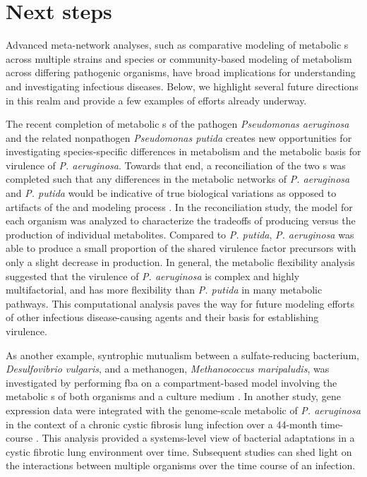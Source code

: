 \section{Next steps}

Advanced meta-network analyses, such as comparative modeling 
of metabolic s across multiple strains and 
species or community-based modeling of metabolism across 
differing pathogenic organisms, have broad implications 
for understanding and investigating infectious diseases. 
Below, we highlight several future directions in this 
realm and provide a few examples of efforts already underway.

The recent completion of metabolic s of the 
pathogen \textit{Pseudomonas aeruginosa} \cite{Oberhardt:2008fr} and the related nonpathogen 
\textit{Pseudomonas putida} \cite{Puchalka:2008ct} creates new opportunities for 
investigating species-specific differences in metabolism 
and the metabolic basis for virulence of \textit{P. aeruginosa}. 
Towards that end, a reconciliation of the two s 
was completed such that any differences in the metabolic 
networks of \textit{P. aeruginosa} and \textit{P. putida} would be indicative 
of true biological variations as opposed to artifacts of 
the  and modeling process \cite{Oberhardt:2011jq}. In the reconciliation 
study, the model for each organism was analyzed to characterize 
the tradeoffs of producing  versus the production of 
individual metabolites. Compared to \textit{P. putida}, \textit{P. aeruginosa} 
was able to produce a small proportion of the shared virulence 
factor precursors with only a slight decrease in  
production. In general, the metabolic flexibility analysis 
suggested that the virulence of \textit{P. aeruginosa} is complex 
and highly multifactorial, and has more flexibility than 
\textit{P. putida} in many metabolic pathways. This computational 
analysis paves the way for future modeling efforts of other 
infectious disease-causing agents and their basis for establishing 
virulence.

As another example, syntrophic mutualism between a sulfate-reducing 
bacterium, \textit{Desulfovibrio vulgaris}, and a methanogen, \textit{Methanococcus 
maripaludis}, was investigated by performing \gls{fba} on a compartment-based 
model involving the metabolic s of both organisms 
and a culture medium \cite{Stolyar:2007jh}. In another study, gene expression data 
were integrated with the genome-scale metabolic  of 
\textit{P. aeruginosa} in the context of a chronic cystic fibrosis lung 
infection over a 44-month time-course \cite{Oberhardt:2010bp}. This analysis provided 
a systems-level view of bacterial adaptations in a cystic fibrotic 
lung environment over time. Subsequent studies can shed light on 
the interactions between multiple organisms over the time course 
of an infection.

